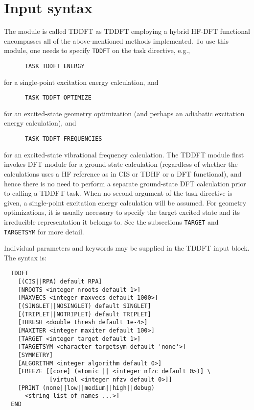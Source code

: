 \section{Input syntax}

The module is called TDDFT as TDDFT employing a hybrid HF-DFT functional 
encompasses all of the above-mentioned methods implemented.  To use this
module, one needs to specify \verb+TDDFT+ on the task directive, e.g.,
\begin{verbatim}
      TASK TDDFT ENERGY
\end{verbatim}
for a single-point excitation energy calculation, and
\begin{verbatim}
      TASK TDDFT OPTIMIZE
\end{verbatim}
for an excited-state geometry optimization (and perhaps an adiabatic
excitation energy calculation), and
\begin{verbatim}
      TASK TDDFT FREQUENCIES
\end{verbatim}
for an excited-state vibrational frequency calculation.  The TDDFT module
first invokes DFT module for a ground-state calculation (regardless of 
whether the calculations uses a HF reference as in CIS or TDHF or a DFT
functional), and hence there is no need to perform a separate ground-state
DFT calculation prior to calling a TDDFT task.  When no second argument
of the task directive is given, a single-point excitation energy calculation
will be assumed.  For geometry optimizations, it is usually necessary to
specify the target excited state and its irreducible representation it
belongs to.  See the subsections \verb+TARGET+ and \verb+TARGETSYM+ for
more detail.

Individual parameters and keywords may be supplied in the TDDFT input
block.  The syntax is:
\begin{verbatim}
  TDDFT
    [(CIS||RPA) default RPA]
    [NROOTS <integer nroots default 1>]
    [MAXVECS <integer maxvecs default 1000>]
    [(SINGLET||NOSINGLET) default SINGLET]
    [(TRIPLET||NOTRIPLET) default TRIPLET]
    [THRESH <double thresh default 1e-4>]
    [MAXITER <integer maxiter default 100>]
    [TARGET <integer target default 1>]
    [TARGETSYM <character targetsym default 'none'>]
    [SYMMETRY]
    [ALGORITHM <integer algorithm default 0>]
    [FREEZE [[core] (atomic || <integer nfzc default 0>)] \
             [virtual <integer nfzv default 0>]]
    [PRINT (none||low||medium||high||debug)
      <string list_of_names ...>]
  END
\end{verbatim}

